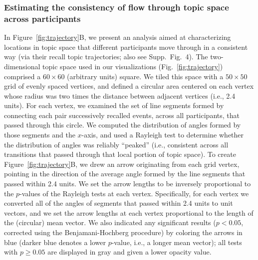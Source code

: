 \documentclass[10pt]{article}
\newcommand{\arrows}{4}
\begin{document}
\subsubsection*{Estimating the consistency of flow through topic space across participants}
In Figure~\ref{fig:trajectory}B, we present an analysis aimed at characterizing locations in topic space that different participants move through in a consistent way (via their recall topic trajectories; also see Supp.\ Fig.~\arrows).  The two-dimensional topic space used in our visualizations (Fig.~\ref{fig:trajectory}) comprised a $60 \times 60$ (arbitrary units) square.  We tiled this space with a $50 \times 50$ grid of evenly spaced vertices, and defined a circular area centered on each vertex whose radius was two times the distance between adjacent vertices (i.e., 2.4 units).  For each vertex, we examined the set of line segments formed by connecting each pair successively recalled events, across all participants, that passed through this circle.  We computed the distribution of angles formed by those segments and the $x$-axis, and used a Rayleigh test to determine whether the distribution of angles was reliably ``peaked'' (i.e., consistent across all transitions that passed through that local portion of topic space).  To create Figure~\ref{fig:trajectory}B, we drew an arrow originating from each grid vertex, pointing in the direction of the average angle formed by the line segments that passed within 2.4 units.  We set the arrow lengths to be inversely proportional to the $p$-values of the Rayleigh tests at each vertex.  Specifically, for each vertex we converted all of the angles of segments that passed within 2.4 units to unit vectors, and we set the arrow lengths at each vertex proportional to the length of the (circular) mean vector.  We also indicated any significant results ($p < 0.05$, corrected using the Benjamani-Hochberg procedure) by coloring the arrows in blue (darker blue denotes a lower $p$-value, i.e., a longer mean vector); all tests with $p \geq 0.05$ are displayed in gray and given a lower opacity value.
\end{document}
